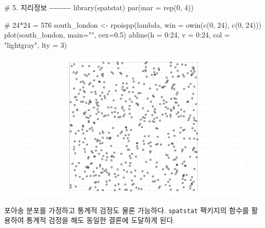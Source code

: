 \documentclass[
  letterpaper,
  chapter,a4paper,showtrims,openright,hidelinks]{oblivoir}
\newenvironment{Shaded}{\begin{snugshade}}{\end{snugshade}}
\newcommand{\AttributeTok}[1]{\textcolor[rgb]{0.40,0.45,0.13}{#1}}
\newcommand{\CommentTok}[1]{\textcolor[rgb]{0.37,0.37,0.37}{#1}}
\newcommand{\DecValTok}[1]{\textcolor[rgb]{0.68,0.00,0.00}{#1}}
\newcommand{\FloatTok}[1]{\textcolor[rgb]{0.68,0.00,0.00}{#1}}
\newcommand{\FunctionTok}[1]{\textcolor[rgb]{0.28,0.35,0.67}{#1}}
\newcommand{\NormalTok}[1]{\textcolor[rgb]{0.00,0.23,0.31}{#1}}
\newcommand{\OtherTok}[1]{\textcolor[rgb]{0.00,0.23,0.31}{#1}}
\newcommand{\SpecialCharTok}[1]{\textcolor[rgb]{0.37,0.37,0.37}{#1}}
\newcommand{\StringTok}[1]{\textcolor[rgb]{0.13,0.47,0.30}{#1}}
\begin{document}
\begin{Shaded}
\begin{Highlighting}[]
\CommentTok{\# 5. 지리정보 {-}{-}{-}{-}{-}{-}{-}{-}{-}}
\FunctionTok{library}\NormalTok{(spatstat)}
\FunctionTok{par}\NormalTok{(}\AttributeTok{mar =} \FunctionTok{rep}\NormalTok{(}\DecValTok{0}\NormalTok{, }\DecValTok{4}\NormalTok{))}

\CommentTok{\# 24*24 = 576}
\NormalTok{south\_london }\OtherTok{\textless{}{-}} \FunctionTok{rpoispp}\NormalTok{(lambda, }\AttributeTok{win =} \FunctionTok{owin}\NormalTok{(}\FunctionTok{c}\NormalTok{(}\DecValTok{0}\NormalTok{, }\DecValTok{24}\NormalTok{), }\FunctionTok{c}\NormalTok{(}\DecValTok{0}\NormalTok{, }\DecValTok{24}\NormalTok{)))}
\FunctionTok{plot}\NormalTok{(south\_london, }\AttributeTok{main=}\StringTok{""}\NormalTok{, }\AttributeTok{cex=}\FloatTok{0.5}\NormalTok{)}
\FunctionTok{abline}\NormalTok{(}\AttributeTok{h =} \DecValTok{0}\SpecialCharTok{:}\DecValTok{24}\NormalTok{, }\AttributeTok{v =} \DecValTok{0}\SpecialCharTok{:}\DecValTok{24}\NormalTok{, }\AttributeTok{col =} \StringTok{"lightgray"}\NormalTok{, }\AttributeTok{lty =} \DecValTok{3}\NormalTok{)}
\end{Highlighting}
\end{Shaded}

\begin{figure}[H]

{\centering \includegraphics{cs_prussia_files/figure-pdf/v2-spatial-viz-1.pdf}

}

\end{figure}

포아송 분포를 가정하고 통계적 검정도 물론 가능하다. \texttt{spatstat}
팩키지의 함수를 활용하여 통계적 검정을 해도 동일한 결론에 도달하게 된다.
\end{document}
